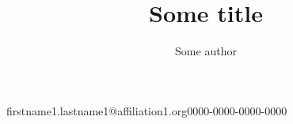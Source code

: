 \documentclass{lni}
\begin{document}
\title{Some title}
\author[1]{Some author}{firstname1.lastname1@affiliation1.org}{0000-0000-0000-0000}
\maketitle
\end{document}

